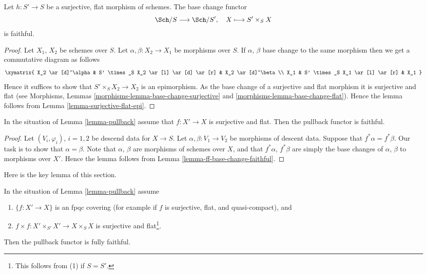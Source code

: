 \begin{lemma}
\label{lemma-ff-base-change-faithful}
Let $h : S' \to S$ be a surjective, flat morphism of
schemes. The base change functor
$$
\Sch/S \longrightarrow \Sch/S', \quad
X \longmapsto S' \times_S X
$$
is faithful.
\end{lemma}

\begin{proof}
Let $X_1$, $X_2$ be schemes over $S$.
Let $\alpha, \beta : X_2 \to X_1$ be morphisms over $S$.
If $\alpha$, $\beta$ base change to the same morphism then
we get a commutative diagram as follows
$$
\xymatrix{
X_2 \ar[d]^\alpha &
S' \times_S X_2 \ar[l] \ar[d] \ar[r] &
X_2 \ar[d]^\beta \\
X_1 &
S' \times_S X_1 \ar[l] \ar[r] &
X_1
}
$$
Hence it suffices to show that $S' \times_S X_2 \to X_2$
is an epimorphism. As the base change of a surjective and
flat morphism it is surjective and flat (see
Morphisms, Lemmas \ref{morphisms-lemma-base-change-surjective}
and \ref{morphisms-lemma-base-change-flat}). Hence the lemma follows
from Lemma \ref{lemma-surjective-flat-epi}.
\end{proof}

\begin{lemma}
\label{lemma-faithful}
In the situation of Lemma \ref{lemma-pullback}
assume that $f : X' \to X$ is surjective
and flat. Then the pullback functor is faithful.
\end{lemma}

\begin{proof}
Let $(V_i, \varphi_i)$, $i = 1, 2$ be descend data for $X \to S$.
Let $\alpha, \beta : V_1 \to V_2$ be morphisms of descent data.
Suppose that $f^*\alpha = f^*\beta$. Our task is to show that
$\alpha = \beta$. Note that $\alpha$, $\beta$ are morphisms
of schemes over $X$, and that $f^*\alpha$, $f^*\beta$ are
simply the base changes of $\alpha$, $\beta$ to morphisms over
$X'$. Hence the lemma follows from Lemma \ref{lemma-ff-base-change-faithful}.
\end{proof}

\noindent
Here is the key lemma of this section.

\begin{lemma}
\label{lemma-fully-faithful}
In the situation of Lemma \ref{lemma-pullback}
assume
\begin{enumerate}
\item $\{f : X' \to X\}$ is an fpqc covering (for example if $f$ is
surjective, flat, and quasi-compact), and
\item $f \times f : X' \times_{S'} X' \to X \times_S X$ is
surjective and flat\footnote{This follows from (1) if $S = S'$.}.
\end{enumerate}
Then the pullback functor is fully faithful.
\end{lemma}

